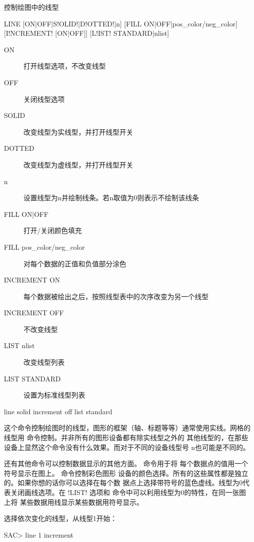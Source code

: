 \label{cmd:line}

控制绘图中的线型

\begin{SACSTX}
LINE [ON|OFF|S!OLID!|D!OTTED!|n] [FILL ON|OFF|pos_color/neg_color]
    [I!NCREMENT! [ON|OFF]] [L!IST! STANDARD|nlist]
\end{SACSTX}

\begin{description}
\item [ON] 打开线型选项，不改变线型
\item [OFF] 关闭线型选项
\item [SOLID] 改变线型为实线型，并打开线型开关
\item [DOTTED] 改变线型为虚线型，并打开线型开关
\item [n] 设置线型为n并绘制线条。若n取值为0则表示不绘制该线条
\item [FILL ON|OFF] 打开/关闭颜色填充
\item [FILL pos\_color/neg\_color] 对每个数据的正值和负值部分涂色
\item [INCREMENT ON] 每个数据被绘出之后，按照线型表中的次序改变为另一个线型
\item [INCREMENT OFF] 不改变线型
\item [LIST nlist] 改变线型列表
\item [LIST STANDARD] 设置为标准线型列表
\end{description}

\begin{SACDFT}
line solid increment off list standard
\end{SACDFT}

这个命令控制绘图时的线型，图形的框架（轴、标题等等）通常使用实线。网格的
线型用  命令控制。并非所有的图形设备都有除实线型之外的
其他线型的，在那些设备上显然这个命令没有什么效果。而对于不同的设备线型号
n也可能是不同的。

还有其他命令可以控制数据显示的其他方面。 命令用于将
每个数据点的值用一个符号显示在图上。 命令控制彩色图形
设备的颜色选择。所有的这些属性都是独立的。如果你想的话你可以选择在每个数
据点上选择带符号的蓝色虚线。线型为0代表关闭画线选项。在 !LIST!
选项和  命令中可以利用线型为0的特性，在同一张图上将
某些数据用线显示某些数据用符号显示。

选择依次变化的线型，从线型1开始：
\begin{SACCode}
SAC> line 1 increment
\end{SACCode}


